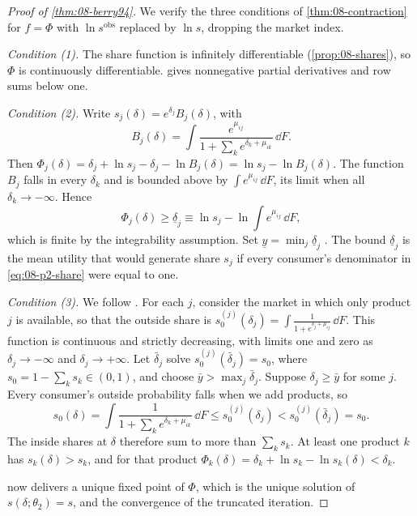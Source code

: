 \begin{proof}[Proof of \cref{thm:08-berry94}]
We verify the three conditions of \cref{thm:08-contraction} for $f = \Phi$ with $\ln s^{\text{obs}}$ replaced by
$\ln s$, dropping the market index.

\emph{Condition (1).} The share function is infinitely differentiable (\cref{prop:08-shares}), so $\Phi$ is
continuously differentiable.  gives nonnegative partial derivatives and row sums below
one.

\emph{Condition (2).} Write $s_j(\delta) = e^{\delta_j}B_j(\delta)$, with
\begin{equation*}
  B_j(\delta) = \int \frac{e^{\mu_{ij}}}{1 + \sum_k e^{\delta_k + \mu_{ik}}}\, \dd F.
\end{equation*}
Then $\Phi_j(\delta) = \delta_j + \ln s_j - \delta_j - \ln B_j(\delta) = \ln s_j - \ln B_j(\delta)$. The
function $B_j$ falls in every $\delta_k$ and is bounded above by $\int e^{\mu_{ij}}\, \dd F$, its limit
when all $\delta_k \to -\infty$. Hence
\begin{equation*}
  \Phi_j(\delta) \geq \underline\delta_j \equiv \ln s_j - \ln\int e^{\mu_{ij}}\, \dd F,
\end{equation*}
which is finite by the integrability assumption. Set $\underline y = \min_j \underline\delta_j$
\citep[p.~888]{BerryLevinsohnPakes1995}. The bound $\underline\delta_j$ is the mean utility that would
generate share $s_j$ if every consumer's denominator in \eqref{eq:08-p2-share} were equal to one.

\emph{Condition (3).} We follow \citet[p.~261]{Berry1994}. For each $j$, consider the market in which only
product $j$ is available, so that the outside share is $s_0^{(j)}(\delta_j) = \int \frac{1}{1 + e^{\delta_j
+ \mu_{ij}}}\, \dd F$. This function is continuous and strictly decreasing, with limits one and zero as
$\delta_j \to -\infty$ and $\delta_j \to +\infty$. Let $\bar\delta_j$ solve $s_0^{(j)}(\bar\delta_j) = s_0$,
where $s_0 = 1 - \sum_k s_k \in (0,1)$, and choose $\bar y > \max_j \bar\delta_j$. Suppose $\delta_j \geq
\bar y$ for some $j$. Every consumer's outside probability falls when we add products, so
\begin{equation*}
  s_0(\delta) = \int \frac{1}{1 + \sum_k e^{\delta_k + \mu_{ik}}}\, \dd F \leq s_0^{(j)}(\delta_j) <
  s_0^{(j)}(\bar\delta_j) = s_0.
\end{equation*}
The inside shares at $\delta$ therefore sum to more than $\sum_k s_k$. At least one product $k$ has
$s_k(\delta) > s_k$, and for that product $\Phi_k(\delta) = \delta_k + \ln s_k - \ln s_k(\delta) <
\delta_k$.

 now delivers a unique fixed point of $\Phi$, which is the unique solution of
$s(\delta;\theta_2) = s$, and the convergence of the truncated iteration.
\end{proof}

